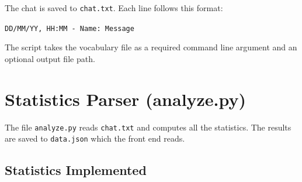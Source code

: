 \documentclass{article}
\begin{document}
The chat is saved to \texttt{chat.txt}. Each line follows this format:

\texttt{DD/MM/YY, HH:MM - Name: Message}

The script takes the vocabulary file as a required command line argument and an optional output file path.

\section{Statistics Parser (analyze.py)}

The file \texttt{analyze.py} reads \texttt{chat.txt} and computes all the statistics. The results are saved to \texttt{data.json} which the front end reads.

\subsection*{Statistics Implemented}
\end{document}
